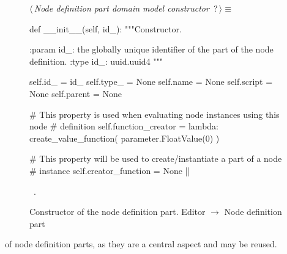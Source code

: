 \documentclass[%
    a4paper,    %
    justified,  %
    nobib,      %
    openany     %
]{tufte-book}
\makeatletter
\renewcommand{\label}[1]{\@tufte@label{##1}}%
\makeatother
\begin{document}
\begin{figure}
\begin{flushleft} \small
\begin{minipage}{\linewidth}\label{scrap110}\raggedright\small
{} $\langle\,${\itshape Node definition part domain model constructor}\nobreak\ {\footnotesize {?}}$\,\rangle\equiv$
\vspace{-1ex}
\begin{pythoncode}
def __init__(self, id_):
    """Constructor.

    :param id_: the globally unique identifier of the part of the node
                definition.
    :type  id_: uuid.uuid4
    """

    self.id_    = id_
    self.type_  = None
    self.name   = None
    self.script = None
    self.parent = None

    # This property is used when evaluating node instances using this node
    # definition
    self.function_creator = lambda: create_value_function(
        parameter.FloatValue(0)
    )

    # This property will be used to create/instantiate a part of a node
    # instance
    self.creator_function = None
    |\NWsep|
\end{pythoncode}
\vspace{1.5ex}
\footnotesize
\begin{list}{}{\setlength{\itemsep}{-\parsep}\setlength{\itemindent}{-\leftmargin}}
\item \NWtxtMacroRefIn\ .

\item{}
\end{list}
\end{minipage}\vspace{4ex}
\end{flushleft}
\caption{Constructor of the node definition part.
  \newline{}\newline{}Editor $\rightarrow$ Node definition part}
\label{editor:lst:node-definition-part:constructor}
\end{figure}

 of node definition parts, as
they are a central aspect and may be reused.
\end{document}
